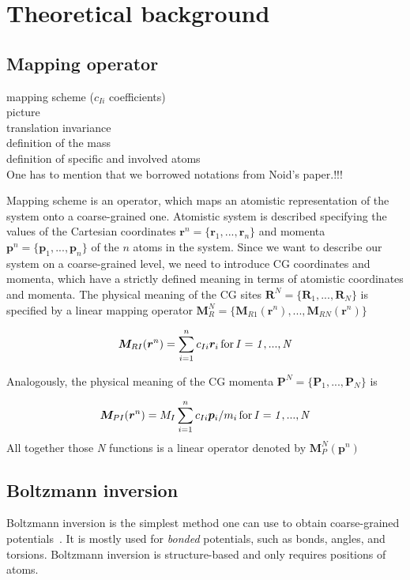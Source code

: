 \chapter{Theoretical background}

\section{Mapping operator}
\sasha
mapping scheme ($c_{Ii}$ coefficients) \\
picture \\
translation invariance \\
definition of the mass \\
definition of specific and involved atoms \\

One has to mention that we borrowed notations from Noid's paper.!!!

Mapping scheme is an operator, which maps an atomistic representation of the system onto a coarse-grained one.
Atomistic system is described specifying the values of the Cartesian coordinates $\bm r^n = \{\bm r_1,...,\bm r_n\}$ and momenta 
$\bm p^n = \{\bm p_1,...,\bm p_n\}$ of the $n$ atoms in the system. Since we want to describe our system on a coarse-grained level, we need to introduce CG coordinates and momenta, which have a strictly defined meaning in terms of atomistic coordinates and momenta. The physical meaning of the CG sites $\bm R^N = \{\bm R_1,...,\bm R_N\}$ is specified by a linear mapping operator
$\bm M_R^N = \{\bm M_{R1}(\bm r^n),...,\bm M_{RN}(\bm r^n)\}$

\begin{equation}
 \bm M_{RI}(\bm r^n)=\sum_{i=1}^{n}c_{Ii}\bm r_i \, \rm for\, \it I = 1,...,N
\end{equation}

Analogously, the physical meaning of the CG momenta $\bm P^N = \{\bm P_1,...,\bm P_N\}$ is

\begin{equation}
 \bm M_{PI}(\bm r^n)=M_I\sum_{i=1}^{n}c_{Ii}\bm p_i/m_i \, \rm for\, \it I = 1,...,N
\end{equation}
All together those {\it N} functions is a linear operator denoted by $\bm M_P^N(\bm p^n)$


\section{Boltzmann inversion}
Boltzmann inversion is the simplest method one can use to obtain coarse-grained potentials~\cite{Tschoep:1998}. It is mostly used for {\em bonded} potentials, such as bonds, angles, and torsions. Boltzmann inversion is structure-based and only requires positions of atoms.

